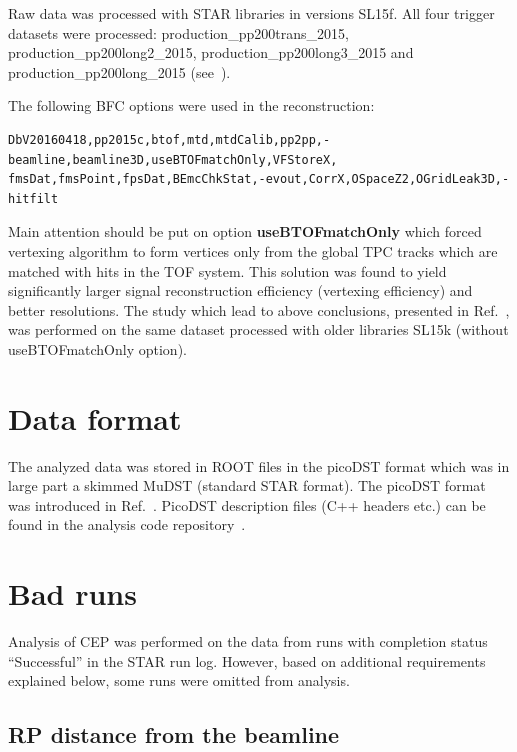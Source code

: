 Raw data was processed with STAR libraries in versions SL15f. All four trigger datasets were processed: production\_pp200trans\_2015, production\_pp200long2\_2015, production\_pp200long3\_2015 and production\_pp200long\_2015 (see~\cite{ProductionList}).

The following BFC options were used in the reconstruction:\vspace{-5pt}
\begin{verbatim}
DbV20160418,pp2015c,btof,mtd,mtdCalib,pp2pp,-beamline,beamline3D,useBTOFmatchOnly,VFStoreX,
fmsDat,fmsPoint,fpsDat,BEmcChkStat,-evout,CorrX,OSpaceZ2,OGridLeak3D,-hitfilt
\end{verbatim}
Main attention should be put on option \textbf{useBTOFmatchOnly} which forced vertexing algorithm to form vertices only from the global TPC tracks which are matched with hits in the TOF system. This solution was found to yield significantly larger signal reconstruction efficiency (vertexing efficiency) and better resolutions. The study which lead to above conclusions, presented in Ref.~\cite{RevertexingProposal}, was performed on the same dataset processed with older libraries SL15k (without useBTOFmatchOnly option).



\section{Data format}\label{sec:dataFormat}

The analyzed data was stored in ROOT files in the picoDST format which was in large part a skimmed MuDST (standard STAR format). The picoDST format was introduced in Ref.~\cite{PicoDstDescription}. PicoDST description files (C++ headers etc.) can be found in the analysis code repository~\cite{AnalysisCodeRepo}.

\section{Bad runs}\label{sec:badRuns}

Analysis of CEP was performed on the data from runs with completion status ``Successful'' in the STAR run log. However, based on additional requirements explained below, some runs were omitted from analysis.

\subsection{RP distance from the beamline}

